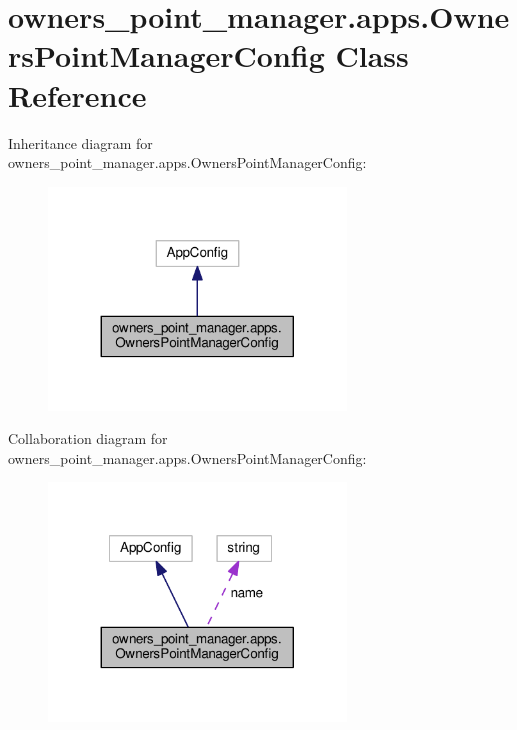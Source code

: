 \hypertarget{classowners__point__manager_1_1apps_1_1OwnersPointManagerConfig}{\section{owners\-\_\-point\-\_\-manager.\-apps.\-Owners\-Point\-Manager\-Config Class Reference}
\label{classowners__point__manager_1_1apps_1_1OwnersPointManagerConfig}
}


Inheritance diagram for owners\-\_\-point\-\_\-manager.\-apps.\-Owners\-Point\-Manager\-Config\-:
\nopagebreak
\begin{figure}[H]
\begin{center}
\leavevmode
\includegraphics[width=224pt]{classowners__point__manager_1_1apps_1_1OwnersPointManagerConfig__inherit__graph}
\end{center}
\end{figure}


Collaboration diagram for owners\-\_\-point\-\_\-manager.\-apps.\-Owners\-Point\-Manager\-Config\-:
\nopagebreak
\begin{figure}[H]
\begin{center}
\leavevmode
\includegraphics[width=224pt]{classowners__point__manager_1_1apps_1_1OwnersPointManagerConfig__coll__graph}
\end{center}
\end{figure}
